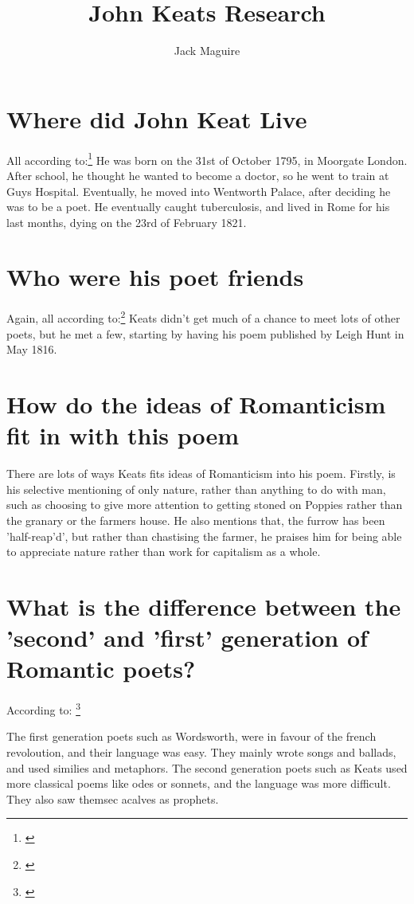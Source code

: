 \documentclass[11pt, oneside]{article}
\title{John Keats Research}
\author{Jack Maguire}
\begin{document}
\maketitle

\section {Where did John Keat Live}
All according to:\footnote{\textcite{wiki-keats}}
He was born on the 31st of October 1795, in Moorgate London.
After school, he thought he wanted to become a doctor, so he went to train at Guys Hospital.
Eventually, he moved into Wentworth Palace, after deciding he was to be a poet.
He eventually caught tuberculosis, and lived in Rome for his last months, dying on the 23rd of February 1821.

\section {Who were his poet friends}
Again, all according to:\footnote{\textcite{wiki-keats}}
Keats didn't get much of a chance to meet lots of other poets, but he met a few, starting by having his poem published by Leigh Hunt in May 1816.


\section{How do the ideas of Romanticism fit in with this poem}
There are lots of ways Keats fits ideas of Romanticism into his poem. Firstly, is his selective mentioning of only nature, rather than anything to do with man, such as choosing to give more attention to getting stoned on Poppies rather than the granary or the farmers house.
He also mentions that, the furrow has been 'half-reap'd', but rather than chastising the farmer, he praises him for being able to appreciate nature rather than work for capitalism as a whole.

\section {What is the difference between the 'second' and 'first' generation of Romantic poets?}
According to: \footnote{\textcite{epertutti-romanticpoets}}

The first generation poets such as Wordsworth, were in favour of the french revoloution, and their language was easy. They mainly wrote songs and ballads, and used similies and metaphors.
\newline
The second generation poets such as Keats used more classical poems like odes or sonnets, and the language was more difficult. They also saw themsec acalves as prophets.



\newpage
\printbibliography
\end{document}
